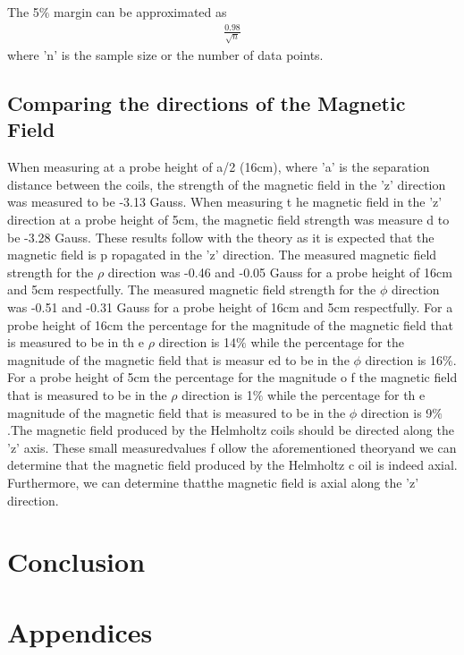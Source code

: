 \documentclass[a4paper]{article}
\begin{document}
The 5$\%$ margin can be approximated as
\begin{align}
\frac{0.98}{\sqrt{n}}
\end{align}
where 'n' is the sample size or the number of data points.

\subsection{Comparing the directions of the Magnetic Field}


\qq When measuring at a probe height of a/2 (16cm), where 'a' is the separation
distance between the coils, the strength of the magnetic field in the 'z'
direction was measured to be -3.13 Gauss. When measuring t he magnetic field in
the 'z' direction at a probe height of 5cm, the magnetic field strength was
measure d to be -3.28 Gauss. These results follow with the theory as it is
expected that the magnetic field is p ropagated in the 'z' direction. The
measured magnetic field strength for the $\rho$ direction was -0.46 and -0.05
Gauss for a probe height of 16cm and 5cm respectfully. The measured magnetic
field strength for the $\phi$ direction was -0.51 and -0.31 Gauss for a probe
height of 16cm and 5cm respectfully. For a probe height of 16cm the percentage
for the magnitude of the magnetic field that is measured to be in th e $\rho$
direction is 14$\%$ while the percentage for the magnitude of the magnetic field
that is measur ed to be in the $\phi$ direction is 16$\%$. For a probe height of
5cm the percentage for the magnitude o f the magnetic field that is measured to
be in the $\rho$ direction is 1$\%$ while the percentage for th e magnitude of
the magnetic field that is measured to be in the $\phi$ direction is 9$\%$.The
magnetic field produced by the Helmholtz coils should be directed along the 'z'
axis. These small measuredvalues f ollow the aforementioned theoryand we can
determine that the magnetic field produced by the Helmholtz c oil is indeed
axial. Furthermore, we can determine thatthe magnetic field is axial along the
'z' direction.


\section{Conclusion}
\qq 

\section{Appendices}
\end{document}

